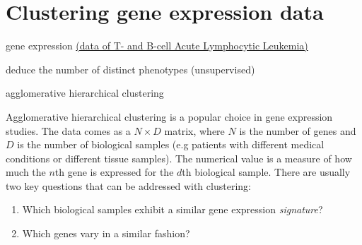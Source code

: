 \documentclass[a4paper,11pt]{article}
\begin{document}
\section{Clustering gene expression data}
\begin{framed}
\begin{description}[leftmargin=5em,style=nextline]\addtolength{\itemsep}{-0.2\baselineskip}
	\item[Data:] gene expression \href{http://www.bioconductor.org/packages/release/data/experiment/html/ALL.html}{(data of T- and B-cell Acute Lymphocytic Leukemia)}	
	\item[Task:] deduce the number of distinct phenotypes (unsupervised)
	\item[Method:] agglomerative hierarchical clustering
\end{description} 
\end{framed}

Agglomerative hierarchical clustering is a popular choice in gene expression studies.
The data comes as a $N \times D$ matrix, where $N$ is the number of genes and $D$ is 
the number of biological samples (e.g patients with different medical conditions or 
different tissue samples). The numerical value is a measure of how much the $n$th gene
is expressed for the $d$th biological sample. There are usually two key questions that
can be addressed with clustering:

\begin{enumerate}
	\item Which biological samples exhibit a similar gene expression \textit{signature}?
	\item Which genes vary in a similar fashion?
\end{enumerate} 
\end{document}
